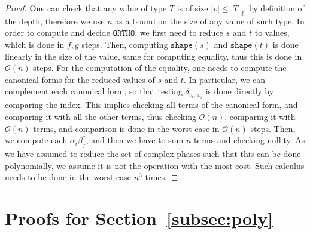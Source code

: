 \documentclass[10pt,a4paper]{article}
\newcommand{\shape}[1]{\mathtt{shape}(#1)}
\newcommand{\portho}{\mathtt{ORTHO}}
\newcommand\kron[2]{\delta_{#1, #2}}
\newcommand{\size}[1]{|#1|}
\newcommand{\mcal}{\mathcal}
\begin{document}
\begin{proof}
  One can check that any value of type $T$ is of size $\size v \leq \size T_d$,
  by definition of the depth, therefore we use $n$ as a bound on the size of
  any value of such type. In order to compute and decide $\portho$, we first
  need to reduce $s$ and $t$ to values, which is done in $f, g$ steps. Then,
  computing $\shape s$ and $\shape t$ is done linearly in the size of the
  value, same for computing equality, thus this is done in $\mcal O(n)$ steps.
  For the computation of the equality, one needs to compute the canonical forms
  for the reduced values of $s$ and $t$. In particular, we can complement each
  canonical form, so that testing $\kron{v_i}{w_j}$ is done directly by
  comparing the index. This implies checking all terms of the canonical form,
  and comparing it with all the other terms, thus checking $\mcal O(n)$,
  comparing it with $\mcal O(n)$ terms, and comparison is done in the worst
  case in $\mcal O(n)$ steps. Then, we compute each $\alpha_i \beta_j^*$, and
  then we have to sum $n$ terms and checking nullity. As we have assumed to
  reduce the set of complex phases such that this can be done polynomially, we
  assume it is not the operation with the most cost. Such calculus needs to be
  done in the worst case $n^3$ times.
\end{proof}

\section{Proofs for Section~\ref{subsec:poly}}

\circuitbound*
\end{document}
